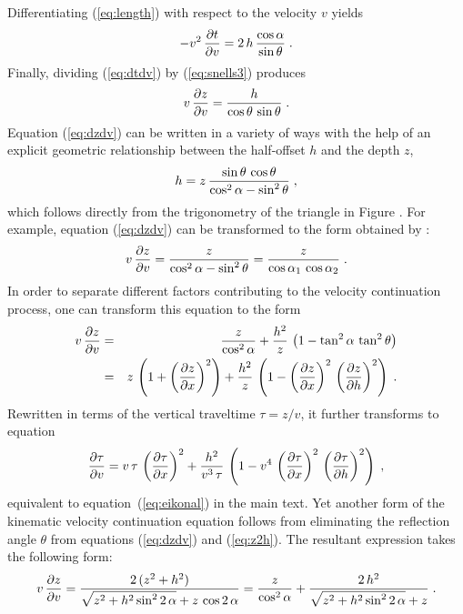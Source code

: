 Differentiating (\ref{eq:length}) with respect to the velocity $v$ yields
\begin{equation}
- v^2\,{{\partial t} \over {\partial v}} = 
2\,h\,{\cos{\alpha} \over \sin{\theta}}\;.
\label{eq:dtdv} 
\end{equation}
Finally, dividing (\ref{eq:dtdv}) by (\ref{eq:snells3}) produces
\begin{equation}
v\,{{\partial z} \over {\partial v}} = 
{h \over {\cos{\theta}\,\sin{\theta}}}\;.
\label{eq:dzdv} 
\end{equation}
Equation (\ref{eq:dzdv}) can be written in a variety of ways with the help
of an explicit geometric relationship between the half-offset $h$ and
the depth $z$, 
\begin{equation}
h = z\,
{{\sin{\theta}\,\cos{\theta}} \over
{\cos^2{\alpha}-\sin^2{\theta}}}\;, 
\label{eq:z2h} 
\end{equation}
which follows directly from the trigonometry of the triangle in Figure
 \cite[]{ofcon}. For example, equation (\ref{eq:dzdv}) can
be transformed to the form obtained by \cite{GEO60-01-01420153}:
\begin{equation}
v\,{{\partial z} \over {\partial v}} = 
{z \over{\cos^2{\alpha}-\sin^2{\theta}}} =
{z \over{\cos{\alpha_1}\,\cos{\alpha_2}}}\;.
\label{eq:liu} 
\end{equation}
In order to separate different factors contributing to the velocity
continuation process, one can transform this equation to the form
\begin{eqnarray}
\nonumber
v\,{{\partial z} \over {\partial v}} & = & 
{z \over {\cos^2{\alpha}}} +
{{h^2} \over z}\,\left(1-\tan^2{\alpha}\,\tan^2{\theta}\right) \\
& = & z\,\left(1 + \left({{\partial z} \over {\partial x}}\right)^2\right) +
{{h^2} \over z}\,\left(1-\left({{\partial z} \over {\partial x}}\right)^2\,
\left({{\partial z} \over {\partial h}}\right)^2\right)\;.
\label{eq:zeikonal} 
\end{eqnarray}
Rewritten in terms of the vertical traveltime $\tau = z/v$, it further
transforms to equation 
\begin{equation}
{{\partial \tau} \over {\partial v}} = 
v\,\tau\,\left({{\partial \tau} \over {\partial x}}\right)^2 +
{{h^2} \over {v^3\,\tau}}\,\left(1 - 
v^4\,
\left({{\partial \tau} \over {\partial x}}\right)^2\,
\left({{\partial \tau} \over {\partial h}}\right)^2\right)\;,
\label{eq:eikonal0} 
\end{equation}
equivalent to equation~(\ref{eq:eikonal}) in the main text. Yet
another form of the kinematic velocity continuation equation follows
from eliminating the reflection angle $\theta$ from equations
(\ref{eq:dzdv}) and (\ref{eq:z2h}). The resultant expression takes the
following form:
\begin{equation}
v\,{{\partial z} \over {\partial v}} = 
{{2\,(z^2 + h^2)} \over
{\sqrt{z^2 + h^2 \sin^2{2\,\alpha}} + z\,\cos{2\,\alpha}}} =
{z \over {\cos^2{\alpha}}} + {{2\,h^2} \over
{\sqrt{z^2 + h^2 \sin^2{2\,\alpha}} + z}}\;.
\label{eq:notheta} 
\end{equation}


